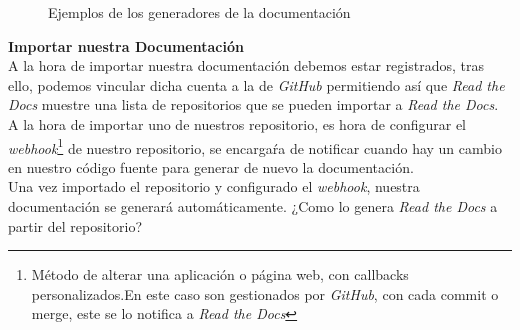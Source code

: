 \begin{figure}[H]
    \centering
    \caption{Ejemplos de los generadores de la documentación}
\end{figure}
\textbf{Importar nuestra Documentación}\\
A la hora de importar nuestra documentación debemos estar registrados, tras ello, podemos vincular dicha cuenta a la de \emph{GitHub} permitiendo así que \emph{Read the Docs} muestre una lista de repositorios que se pueden importar a \emph{Read the Docs}. A la hora de importar uno de nuestros repositorio, es hora de configurar el \emph{webhook}\footnote{Método de alterar una aplicación o página web, con callbacks personalizados.En este caso son gestionados por \emph{GitHub}, con cada commit o merge, este se lo notifica a \emph{Read the Docs}} de nuestro repositorio, se encargaŕa de notificar cuando hay un cambio en nuestro código fuente para generar de nuevo la documentación.\\
Una vez importado el repositorio y configurado el \emph{webhook}, nuestra documentación se generará automáticamente. ¿Como lo genera \emph{Read the Docs} a partir del repositorio?\\
